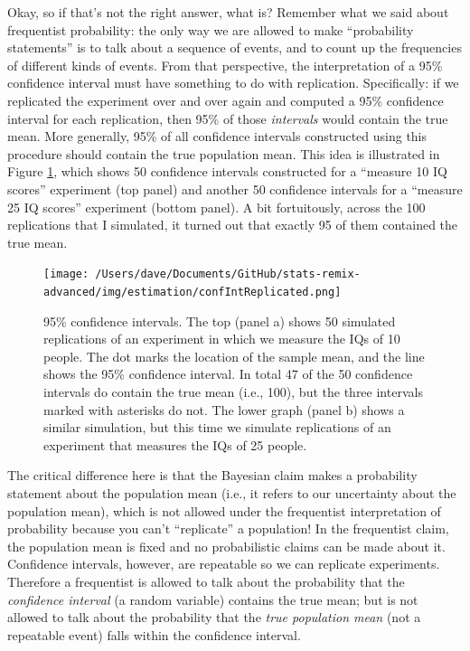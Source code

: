 \documentclass[
]{book}
\begin{document}
Okay, so if that's not the right answer, what is? Remember what we said about frequentist probability: the only way we are allowed to make ``probability statements'' is to talk about a sequence of events, and to count up the frequencies of different kinds of events. From that perspective, the interpretation of a 95\% confidence interval must have something to do with replication. Specifically: if we replicated the experiment over and over again and computed a 95\% confidence interval for each replication, then 95\% of those \emph{intervals} would contain the true mean. More generally, 95\% of all confidence intervals constructed using this procedure should contain the true population mean. This idea is illustrated in Figure \ref{fig:cirep}, which shows 50 confidence intervals constructed for a ``measure 10 IQ scores'' experiment (top panel) and another 50 confidence intervals for a ``measure 25 IQ scores'' experiment (bottom panel). A bit fortuitously, across the 100 replications that I simulated, it turned out that exactly 95 of them contained the true mean.

\begin{figure}
\centering
\texttt{[image: /Users/dave/Documents/GitHub/stats-remix-advanced/img/estimation/confIntReplicated.png]}
\caption{\label{fig:cirep}95\% confidence intervals. The top (panel a) shows 50 simulated replications of an experiment in which we measure the IQs of 10 people. The dot marks the location of the sample mean, and the line shows the 95\% confidence interval. In total 47 of the 50 confidence intervals do contain the true mean (i.e., 100), but the three intervals marked with asterisks do not. The lower graph (panel b) shows a similar simulation, but this time we simulate replications of an experiment that measures the IQs of 25 people.}
\end{figure}

The critical difference here is that the Bayesian claim makes a probability statement about the population mean (i.e., it refers to our uncertainty about the population mean), which is not allowed under the frequentist interpretation of probability because you can't ``replicate'' a population! In the frequentist claim, the population mean is fixed and no probabilistic claims can be made about it. Confidence intervals, however, are repeatable so we can replicate experiments. Therefore a frequentist is allowed to talk about the probability that the \emph{confidence interval} (a random variable) contains the true mean; but is not allowed to talk about the probability that the \emph{true population mean} (not a repeatable event) falls within the confidence interval.
\end{document}
